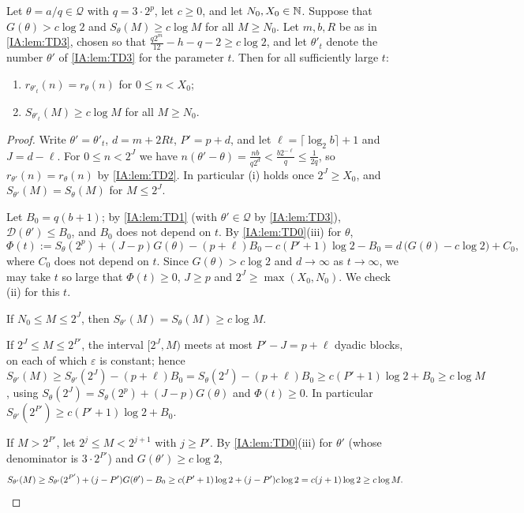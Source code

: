 \begin{lemma}\label{IA:lem:TD4}
Let $\theta=a/q\in\mathcal Q$ with $q=3\cdot2^p$, let $c\ge0$, and let $N_0,X_0\in\mathbb{N}$. Suppose that
$G(\theta)>c\log2$ and $S_\theta(M)\ge c\log M$ for all $M\ge N_0$. Let $m,b,R$ be as in
\cref{IA:lem:TD3}, chosen so that $\frac{q2^m}{12}-h-q-2\ge c\log 2$, and let $\theta'_t$ denote
the number $\theta'$ of \cref{IA:lem:TD3} for the parameter $t$. Then for all sufficiently large $t$:
\begin{enumerate}[label=\textup{(\roman*)}]
\item $r_{\theta'_t}(n)=r_\theta(n)$ for $0\le n<X_0$;
\item $S_{\theta'_t}(M)\ge c\log M$ for all $M\ge N_0$.
\end{enumerate}
\end{lemma}

\begin{proof}
Write $\theta'=\theta'_t$, $d=m+2Rt$, $P'=p+d$, and let $\ell=\lceil\log_2b\rceil+1$ and
$J=d-\ell$. For $0\le n<2^J$ we have $n(\theta'-\theta)=\frac{nb}{q2^d}<\frac{b2^{-\ell}}{q}\le
\frac1{2q}$, so $r_{\theta'}(n)=r_\theta(n)$ by \cref{IA:lem:TD2}. In particular (i) holds once
$2^J\ge X_0$, and $S_{\theta'}(M)=S_\theta(M)$ for $M\le2^J$.

Let $B_0=q(b+1)$; by \cref{IA:lem:TD1} (with $\theta'\in\mathcal Q$ by \cref{IA:lem:TD3}),
$\mathcal D(\theta')\le B_0$, and $B_0$ does not depend on $t$. By \cref{IA:lem:TD0}(iii) for
$\theta$,
\[
\Phi(t):=S_\theta(2^p)+(J-p)G(\theta)-(p+\ell)B_0-c(P'+1)\log2-B_0
= d\,\big(G(\theta)-c\log 2\big)+C_0,
\]
where $C_0$ does not depend on $t$. Since $G(\theta)>c\log2$ and $d\to\infty$ as $t\to\infty$, we may
take $t$ so large that $\Phi(t)\ge0$, $J\ge p$ and $2^J\ge\max(X_0,N_0)$. We check (ii) for this $t$.

If $N_0\le M\le 2^J$, then $S_{\theta'}(M)=S_\theta(M)\ge c\log M$.

If $2^J\le M\le 2^{P'}$, the interval $[2^J,M)$ meets at most $P'-J=p+\ell$ dyadic blocks, on each of
which $\varepsilon$ is constant; hence
$S_{\theta'}(M)\ge S_{\theta'}(2^J)-(p+\ell)B_0=S_\theta(2^J)-(p+\ell)B_0
\ge c(P'+1)\log2+B_0\ge c\log M$, using $S_\theta(2^J)=S_\theta(2^p)+(J-p)G(\theta)$ and
$\Phi(t)\ge0$. In particular $S_{\theta'}(2^{P'})\ge c(P'+1)\log2+B_0$.

If $M>2^{P'}$, let $2^j\le M<2^{j+1}$ with $j\ge P'$. By \cref{IA:lem:TD0}(iii) for $\theta'$ (whose
denominator is $3\cdot2^{P'}$) and $G(\theta')\ge c\log2$,
\[
S_{\theta'}(M)\ge S_{\theta'}(2^{P'})+(j-P')G(\theta')-B_0\ge c(P'+1)\log2+(j-P')c\log2=c(j+1)\log2
\ge c\log M .\qedhere
\]
\end{proof}

